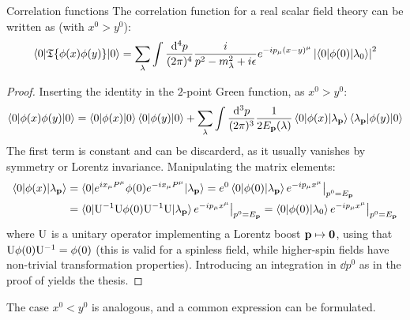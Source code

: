\begin{proposition}{Correlation functions}{}
  The correlation function for a real scalar field theory can be written as (with $ x^0 > y^0 $):
  \begin{equation}
    \braket{0 | \mathfrak{T}\{\phi(x) \phi(y)\} | 0} = \sum_\lambda \int \frac{\mathrm{d}^4p}{(2\pi)^4} \frac{i}{p^2 - m_\lambda^2 + i\epsilon} e^{-i p_\mu (x - y)^\mu} \left\lvert\braket{0 | \phi(0) | \lambda_0}\right\rvert^2
  \end{equation}
\end{proposition}

\begin{proofbox}
  \begin{proof}
    Inserting the identity in the $ 2 $-point Green function, as $ x^0 > y^0 $:
    \begin{equation*}
      \braket{0 | \phi(x) \phi(y) | 0} = \braket{0 | \phi(x) | 0} \braket{0 | \phi(y) | 0} +  \sum_\lambda \int \frac{\mathrm{d}^3p}{(2\pi)^3} \frac{1}{2E_{\mathbf{p}}(\lambda)} \braket{0 | \phi(x) | \lambda_{\mathbf{p}}} \braket{\lambda_{\mathbf{p}} | \phi(y) | 0}
    \end{equation*}
    The first term is constant and can be discarderd, as it usually vanishes by symmetry or Lorentz invariance. Manipulating the matrix elements:
    \begin{equation*}
      \begin{split}
        \braket{0 | \phi(x) | \lambda_{\mathbf{p}}}
        & = \braket{0 | e^{i x_\mu P^\mu} \phi(0) e^{-i x_\mu P^\mu} | \lambda_{\mathbf{p}}} = e^0 \braket{0 | \phi(0) | \lambda_{\mathbf{p}}} e^{-i p_\mu x^\mu} \big\vert_{p^0 = E_{\mathbf{p}}} \\
        & = \braket{0 | \mathrm{U}^{-1} \mathrm{U} \phi(0) \mathrm{U}^{-1} \mathrm{U} | \lambda_{\mathbf{p}}} e^{-i p_\mu x^\mu} \big\vert_{p^0 = E_{\mathbf{p}}} = \braket{0 | \phi(0) | \lambda_0} e^{-i p_\mu x^\mu} \big\vert_{p^0 = E_{\mathbf{p}}}
      \end{split}
    \end{equation*}
    where $ \mathrm{U} $ is a unitary operator implementing a Lorentz boost $ \mathbf{p} \mapsto \mathbf{0} $, using that $ \mathrm{U} \phi(0) \mathrm{U}^{-1} = \phi(0) $ (this is valid for a spinless field, while higher-spin fields have non-trivial transformation properties). Introducing an integration in $ \dd p^0 $ as in the proof of  yields the thesis.
  \end{proof}
\end{proofbox}

The case $ x^0 < y^0 $ is analogous, and a common expression can be formulated.

